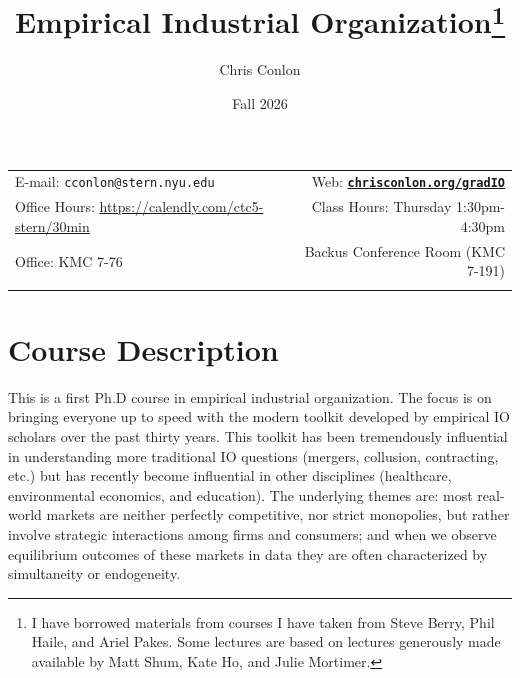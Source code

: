 \documentclass[11pt]{article}
\title{Empirical Industrial Organization\footnote{I have borrowed materials from courses I have taken from Steve Berry, Phil Haile, and Ariel Pakes. Some lectures are based on lectures generously made available by Matt Shum, Kate Ho, and Julie Mortimer.}}
\author{Chris Conlon}
\date{Fall 2026}
\newcommand{\blankline}{\quad\pagebreak[2]}
\begin{document}
\maketitle
\blankline
\begin{tabular*}{.93\textwidth}{@{\extracolsep{\fill}}lr}
  E-mail: \texttt{cconlon@stern.nyu.edu} & Web: \href{http://chrisconlon.org}{\tt\bf chrisconlon.org/gradIO}  \\
  Office Hours: \url{https://calendly.com/ctc5-stern/30min} &  Class Hours: Thursday 1:30pm-4:30pm \\
  Office: KMC 7-76  & Backus Conference Room (KMC 7-191) \\
&  \\
\hline
\end{tabular*}
\vspace{10 mm}
\section*{Course Description}
This is a first Ph.D course in empirical industrial organization. The focus is on bringing everyone up to speed with the modern toolkit developed by empirical IO scholars over the past thirty years. This toolkit has been tremendously influential in understanding more traditional IO questions (mergers, collusion, contracting, etc.) but has recently become influential in other disciplines (healthcare, environmental economics, and education). The underlying themes are: most real-world markets are neither perfectly competitive, nor strict monopolies, but rather involve strategic interactions among firms and consumers; and when we observe equilibrium outcomes of these markets in data they are often characterized by simultaneity or endogeneity.
\end{document}
